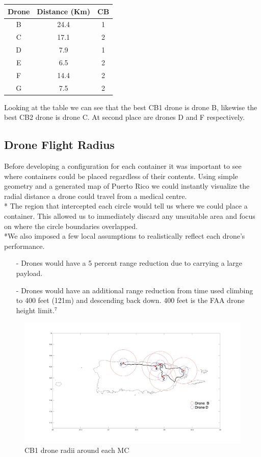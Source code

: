 \documentclass[a4paper,12pt]{article}
\begin{document}
\begin{center}
\begin{tabular}{ |c|c|c| }
 \hline
 Drone & Distance (Km) & CB \\\hline
  B & 24.4 & 1 \\
  C & 17.1 & 2  \\
  D & 7.9 & 1 \\
  E & 6.5 & 2 \\
  F & 14.4 & 2 \\
  G & 7.5 & 2 \\
 \hline
\end{tabular}
\end{center}
Looking at the table we can see that the best CB1 drone is drone B, likewise the best CB2 drone is drone C. At second place are drones D and F respectively.

\subsection{Drone Flight Radius}
Before developing a configuration for each container it was important to see where containers could be placed regardless of their contents.
Using simple geometry and a generated map of Puerto Rico we could instantly visualize the radial distance a drone could travel from a medical centre.\\*
The region that intercepted each circle would tell us where we could place a container. This allowed us to immediately discard any unsuitable area and focus on where the circle boundaries overlapped.
\\*We also imposed a few local assumptions to realistically reflect each drone's performance.

\begin{itemize}
\item[-]Drones would have a 5 percent range reduction due to carrying a large payload.
\item[-]Drones would have an additional range reduction from time used climbing to 400 feet (121m) and descending back down. 400 feet is the FAA drone height limit.$^7$
\end{itemize}

\begin{figure}[p]
\centering
\includegraphics[scale =0.15]{CB1}
\caption{CB1 drone radii around each MC}
\label{cb1}
\end{figure}
\end{document}
